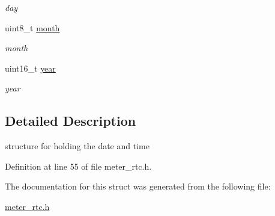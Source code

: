 \begin{DoxyCompactItemize}
\begin{DoxyCompactList}\small\item\em day \end{DoxyCompactList}\item 
\hypertarget{struct_r_t_c___b_c_d__struct_a3e00faf7fbf9805e9ec4d2edd6339050}{uint8\-\_\-t \hyperlink{struct_r_t_c___b_c_d__struct_a3e00faf7fbf9805e9ec4d2edd6339050}{month}}\label{struct_r_t_c___b_c_d__struct_a3e00faf7fbf9805e9ec4d2edd6339050}

\begin{DoxyCompactList}\small\item\em month \end{DoxyCompactList}\item 
\hypertarget{struct_r_t_c___b_c_d__struct_a57ca98d8f6d4baf0fe41c583c7dcb0d5}{uint16\-\_\-t \hyperlink{struct_r_t_c___b_c_d__struct_a57ca98d8f6d4baf0fe41c583c7dcb0d5}{year}}\label{struct_r_t_c___b_c_d__struct_a57ca98d8f6d4baf0fe41c583c7dcb0d5}

\begin{DoxyCompactList}\small\item\em year \end{DoxyCompactList}\end{DoxyCompactItemize}


\subsection{Detailed Description}
structure for holding the date and time 

Definition at line 55 of file meter\-\_\-rtc.\-h.



The documentation for this struct was generated from the following file\-:\begin{DoxyCompactItemize}
\item 
\hyperlink{meter__rtc_8h}{meter\-\_\-rtc.\-h}\end{DoxyCompactItemize}
